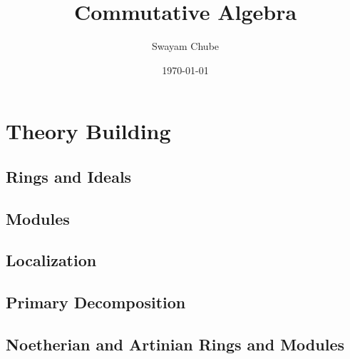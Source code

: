 \documentclass{report}
\title{Commutative Algebra}
\author{Swayam Chube}
\date{\today}
\begin{document}
\maketitle

\begin{abstract}

\end{abstract}

\tableofcontents


\part{Theory Building}
\chapter{Rings and Ideals}


\chapter{Modules}


\chapter{Localization}


\chapter{Primary Decomposition}


\chapter{Noetherian and Artinian Rings and Modules}


% 



\end{document}
